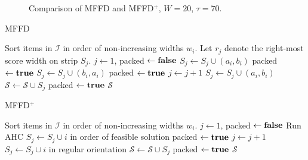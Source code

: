 \documentclass[oribibl]{llncs}
\begin{document}
\begin{figure}[h!]	
	\centering
	
	\caption{Comparison of MFFD and MFFD$^+$, $W = 20$, $\tau = 70$.}	
	\label{fig:comparestrips}
\end{figure}

\begin{algorithm}[H]
\caption{MFFD}
\label{alg:mffd}
\begin{algorithmic}[1]
	\State Sort items in $\mathcal{I}$ in order of non-increasing widths $w_i$.
	\State Let $r_j$ denote the right-most score width on strip $S_j$.
			\State $j \gets 1$, packed $\gets \textbf{false}$
						\State $S_j \gets S_j \cup (a_i, b_i)$
						\State packed $\gets \textbf{true}$
						\State $S_j \gets S_j \cup (b_i, a_i)$
						\State packed $\gets \textbf{true}$
					\Else \hspace{0.2mm} $j \gets j + 1$		
					\EndIf
					\State $S_j \gets S_j \cup (a_i, b_i)$
					\State $\mathcal{S} \gets \mathcal{S} \cup S_j$
					\State packed $\gets \textbf{true}$	
				\EndIf
			\EndWhile	
		\EndFor
	\Return $\mathcal{S}$
\end{algorithmic}	
\end{algorithm}

\begin{algorithm}[H]
\caption{MFFD$^+$}
\label{alg:mffd+}
\begin{algorithmic}[1]
	\State Sort items in $\mathcal{I}$ in order of non-increasing widths $w_i$.
		\State $j \gets 1$, packed $\gets \textbf{false}$
				\State Run AHC
					\State $S_j \gets S_j \cup i$ in order of feasible solution
					\State packed $\gets \textbf{true}$
				\Else \hspace{0.2mm} $j \gets j + 1$					 
				\EndIf
				\State $S_j \gets S_j \cup i$ in regular orientation
				\State $\mathcal{S} \gets \mathcal{S} \cup S_j$	
				\State packed $\gets \textbf{true}$
			\EndIf
		\EndWhile	
	\EndFor
	\Return $\mathcal{S}$
\end{algorithmic}	
\end{algorithm}
\end{document}

